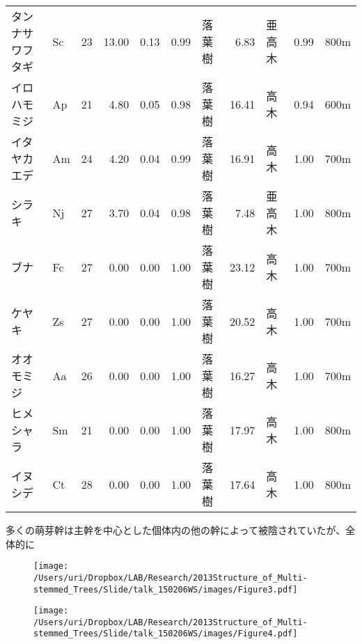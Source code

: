 \documentclass[a0, 36pt, plainboxedsections]{sciposter} %
\renewcommand{\baselinestretch}{1.2}
\begin{document}
\begin{multicols}{2}
\begin{table}[ht]
{\begin{tabular}{llrrrrlrlrl}
タンナサワフタギ  &  Sc &  23 & 13.00 & 0.13 & 0.99 & 落葉樹 & 6.83 & 亜高木 & 0.99 & 800m \\ 
\rowcolor{Blue2!30}イロハモミジ  &  Ap &  21 & 4.80 & 0.05 & 0.98 & 落葉樹 & 16.41 & 高木 & 0.94 & 600m \\ 
\rowcolor{Blue2!30}イタヤカエデ  &  Am &  24 & 4.20 & 0.04 & 0.99 & 落葉樹 & 16.91 & 高木 & 1.00 & 700m \\ 
\rowcolor{Blue2!30}シラキ  &  Nj &  27 & 3.70 & 0.04 & 0.98 & 落葉樹 & 7.48 & 亜高木 & 1.00 & 800m \\ 
\rowcolor{Blue2!30}ブナ  &  Fc &  27 & 0.00 & 0.00 & 1.00 & 落葉樹 & 23.12 & 高木 & 1.00 & 700m \\ 
\rowcolor{Blue2!30}ケヤキ  &  Zs &  27 & 0.00 & 0.00 & 1.00 & 落葉樹 & 20.52 & 高木 & 1.00 & 700m \\ 
\rowcolor{Blue2!30}オオモミジ  &  Aa &  26 & 0.00 & 0.00 & 1.00 & 落葉樹 & 16.27 & 高木 & 1.00 & 700m \\ 
\rowcolor{Blue2!30}ヒメシャラ  &  Sm &  21 & 0.00 & 0.00 & 1.00 & 落葉樹 & 17.97 & 高木 & 1.00 & 800m \\ 
\rowcolor{Blue2!30}イヌシデ  &  Ct &  28 & 0.00 & 0.00 & 1.00 & 落葉樹 & 17.64 & 高木 & 1.00 & 800m \\ 
  \hline\end{tabular}}
\end{table}

\renewcommand{\baselinestretch}{0.8}
\begin{mdframed}[style=subsection.frame]
  \huge\textbf{}
\end{mdframed}
\renewcommand{\baselinestretch}{1.2}

多くの萌芽幹は主幹を中心とした個体内の他の幹によって被陰されていたが、全体的に

\begin{figure}
	\begin{center}
		\texttt{[image: /Users/uri/Dropbox/LAB/Research/2013Structure\_of\_Multi-stemmed\_Trees/Slide/talk\_150206WS/images/Figure3.pdf]}
		
		\texttt{[image: /Users/uri/Dropbox/LAB/Research/2013Structure\_of\_Multi-stemmed\_Trees/Slide/talk\_150206WS/images/Figure4.pdf]}
	\end{center}
\end{figure}

\columnbreak
\renewcommand{\baselinestretch}{0.8}
\begin{mdframed}[style=subsection.frame]
  \huge\textbf{}
\end{mdframed}
\renewcommand{\baselinestretch}{1.2} %


\end{multicols}
\end{document}
